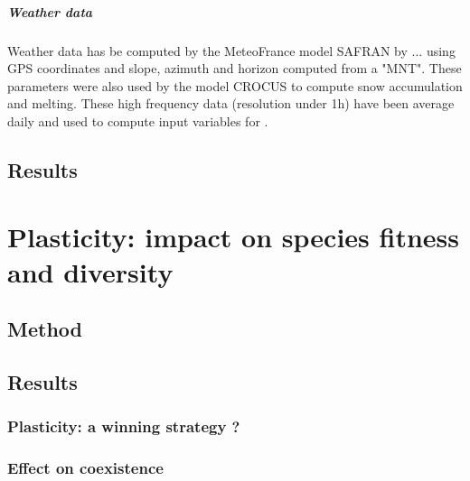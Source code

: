 \paragraph{Weather data}
Weather data has be computed by the MeteoFrance model SAFRAN by ... using GPS coordinates and slope, azimuth and horizon computed from a "MNT". These parameters were also used by the model CROCUS to compute snow accumulation and melting. These high frequency data (resolution under 1h) have been average daily and used to compute input variables for \model . 

\section{Results}

\chapter{Plasticity: impact on species fitness and diversity}

\section{Method}

\section{Results}
\subsection{Plasticity: a winning strategy ?}

\subsection{Effect on coexistence}
